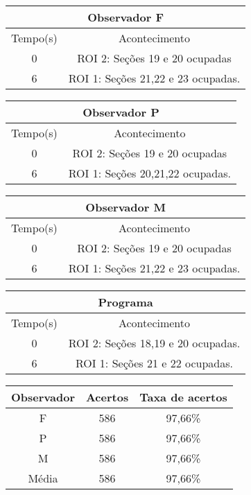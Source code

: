 \begin{center}
\begin{tabular}{|c||c|}
\hline
\multicolumn{2}{|c|}{Observador F}  \\ \hline \hline
Tempo(s) & Acontecimento \\ \hline
0 & ROI 2: Seções 19 e 20 ocupadas \\ \hline
6 & ROI 1: Seções 21,22 e 23 ocupadas. \\
\hline
\end{tabular}
\end{center}

\begin{center}
\begin{tabular}{|c||c|}
\hline
\multicolumn{2}{|c|}{Observador P}  \\ \hline \hline
Tempo(s) & Acontecimento \\ \hline
0 & ROI 2: Seções 19 e 20 ocupadas \\ \hline
6 & ROI 1: Seções 20,21,22 ocupadas. \\
\hline
\end{tabular}
\end{center}

\begin{center}
\begin{tabular}{|c||c|}
\hline
\multicolumn{2}{|c|}{Observador M}  \\ \hline \hline
Tempo(s) & Acontecimento \\ \hline
0 & ROI 2: Seções 19 e 20 ocupadas \\ \hline
6 & ROI 1: Seções 21,22 e 23 ocupadas. \\
\hline
\end{tabular}
\end{center}

\begin{center}
\begin{tabular}{|c||c|}
\hline
\multicolumn{2}{|c|}{Programa}  \\ \hline \hline
Tempo(s) & Acontecimento \\ \hline
0 & ROI 2: Seções 18,19 e 20 ocupadas. \\ \hline
6 & ROI 1: Seções 21 e 22 ocupadas. \\ \hline
\hline
\end{tabular}
\end{center}

\begin{center}
\begin{tabular}{|c||c||c|}
\hline
Observador & Acertos & Taxa de acertos \\ \hline
F & 586 & 97,66\% \\  \hline
P & 586 & 97,66\% \\ \hline
M & 586 & 97,66\% \\ \hline
Média & 586 & 97,66\% \\
\hline
\end{tabular}
\end{center}

